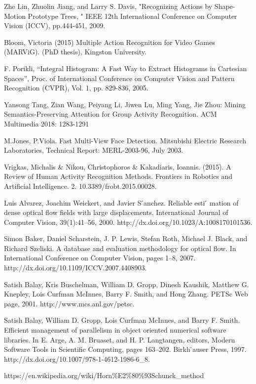 \documentclass[runningheads,a4paper]{llncs}
\begin{document}
\begin{thebibliography}{4}
 Zhe Lin, Zhuolin Jiang, and Larry S. Davis, "Recognizing Actions by Shape-Motion Prototype Trees, " IEEE 12th International Conference on Computer Vision (ICCV), pp.444-451, 2009.

 Bloom, Victoria (2015) Multiple Action Recognition for Video Games (MARViG). (PhD thesis), Kingston University. 

 F. Porikli, “Integral Histogram: A Fast Way to Extract Histograms in Cartesian Spaces”, Proc. of International Conference on Computer Vision and Pattern Recognition (CVPR), Vol. 1, pp. 829-836, 2005.

 Yansong Tang, Zian Wang, Peiyang Li, Jiwen Lu, Ming Yang, Jie Zhou: Mining Semantics-Preserving Attention for Group Activity Recognition. ACM Multimedia 2018: 1283-1291

 M.Jones, P.Viola. Fast Multi-View Face Detection. Mitsubishi Electric Research Laboratories, Technical Report: MERL-2003-96, July 2003.

 Vrigkas, Michalis \& Nikou, Christophoros \& Kakadiaris, Ioannis. (2015). A Review of Human Activity Recognition Methods. Frontiers in Robotics and Artificial Intelligence. 2. 10.3389/frobt.2015.00028. 

 Luis Alvarez, Joachim Weickert, and Javier S ́anchez. Reliable esti  ́ mation of dense optical flow fields with large displacements. International Journal of Computer Vision, 39(1):41–56, 2000. http://dx.doi.org/10.1023/A:1008170101536.

 Simon Baker, Daniel Scharstein, J. P. Lewis, Stefan Roth, Michael J. Black, and Richard Szeliski. A database and evaluation methodology for optical flow. In International Conference on Computer Vision, pages 1–8, 2007. http://dx.doi.org/10.1109/ICCV.2007.4408903.

 Satish Balay, Kris Buschelman, William D. Gropp, Dinesh Kaushik, Matthew G. Knepley, Lois Curfman McInnes, Barry F. Smith, and Hong Zhang. PETSc Web page, 2001. http://www.mcs.anl.gov/petsc.

 Satish Balay, William D. Gropp, Lois Curfman McInnes, and Barry F. Smith. Efficient management of parallelism in object oriented numerical software libraries. In E. Arge, A. M. Bruaset, and H. P. Langtangen, editors, Modern Software Tools in Scientific Computing, pages 163–202. Birkh ̈auser Press, 1997. http://dx.doi.org/10.1007/978-1-4612-1986-6\_8.

 https://en.wikipedia.org/wiki/Horn\%E2\%80\%93Schunck\_method


\end{thebibliography}
\end{document}
